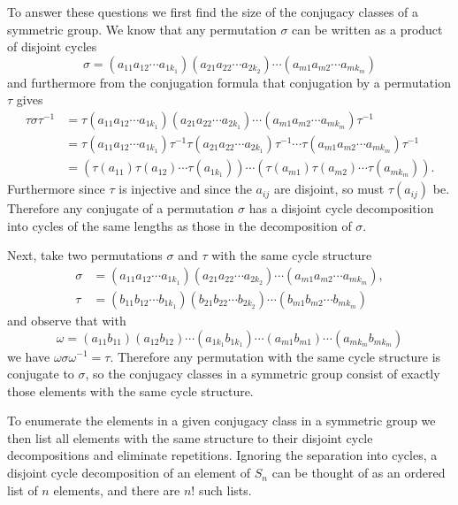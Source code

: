 \documentclass{article}
\begin{document}
\begin{Answer}
To answer these questions we first find the size of the
conjugacy classes of a symmetric group.
We know that any permutation $\sigma$ can be written as a product of
disjoint cycles
$$
\sigma =
  (a_{11} a_{12} \cdots a_{1k_1})
  (a_{21} a_{22} \cdots a_{2k_2})
  \cdots
  (a_{m1} a_{m2} \cdots a_{mk_m})
$$
and furthermore from the conjugation formula that conjugation by a
permutation $\tau$ gives
\begin{align*}
\tau \sigma \tau^{-1} &=
  \tau
  (a_{11} a_{12} \cdots a_{1k_1})
  (a_{21} a_{22} \cdots a_{2k_1})
  \cdots
  (a_{m1} a_{m2} \cdots a_{mk_m})
  \tau^{-1} \\
&=
  \tau
  (a_{11} a_{12} \cdots a_{1k_1})
  \tau^{-1}
  \tau
  (a_{21} a_{22} \cdots a_{2k_1})
  \tau^{-1}
  \cdots
  \tau
  (a_{m1} a_{m2} \cdots a_{mk_m})
  \tau^{-1} \\
&=
  (\tau(a_{11}) \tau(a_{12}) \cdots \tau(a_{1k_1}))
  \cdots
  (\tau(a_{m1}) \tau(a_{m2}) \cdots \tau(a_{mk_m})).
\end{align*}
Furthermore since $\tau$ is injective and since the $a_{ij}$ are
disjoint, so must $\tau(a_{ij})$ be.
Therefore any conjugate of a permutation $\sigma$ has a disjoint
cycle decomposition into cycles of the same lengths as those in the
decomposition of $\sigma$.

Next, take two permutations $\sigma$ and $\tau$ with the same cycle
structure
\begin{align*}
\sigma &=
  (a_{11} a_{12} \cdots a_{1k_1})
  (a_{21} a_{22} \cdots a_{2k_2})
  \cdots
  (a_{m1} a_{m2} \cdots a_{mk_m}), \\
\tau &=
  (b_{11} b_{12} \cdots b_{1k_1})
  (b_{21} b_{22} \cdots b_{2k_2})
  \cdots
  (b_{m1} b_{m2} \cdots b_{mk_m})
\end{align*}
and observe that with
$$
\omega =
  (a_{11} b_{11})
  (a_{12} b_{12})
  \cdots
  (a_{1k_1} b_{1k_1})
  \cdots
  (a_{m1} b_{m1})
  \cdots
  (a_{mk_m} b_{mk_m})
$$
we have $\omega \sigma \omega^{-1} = \tau$. Therefore any permutation
with the same cycle structure is conjugate to $\sigma$, so the
conjugacy classes in a symmetric group consist of exactly those
elements with the same cycle structure.

To enumerate the elements in a given conjugacy class in a symmetric
group we then list all elements with the same structure to their
disjoint cycle decompositions and eliminate repetitions. Ignoring the
separation into cycles, a disjoint cycle decomposition of an element
of $S_n$ can be thought of as an ordered list of $n$ elements, and
there are $n!$ such lists.


\end{Answer}
\end{document}
